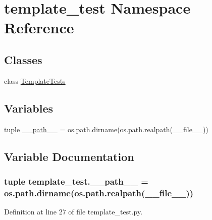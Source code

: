 \hypertarget{namespacetemplate__test}{\section{template\-\_\-test Namespace Reference}
\label{namespacetemplate__test}
}
\subsection*{Classes}
\begin{DoxyCompactItemize}
\item 
class \hyperlink{classtemplate__test_1_1TemplateTests}{Template\-Tests}
\end{DoxyCompactItemize}
\subsection*{Variables}
\begin{DoxyCompactItemize}
\item 
tuple \hyperlink{namespacetemplate__test_adc937cea0e7783070c8057ac549507c9}{\-\_\-\-\_\-path\-\_\-\-\_\-} = os.\-path.\-dirname(os.\-path.\-realpath(\-\_\-\-\_\-file\-\_\-\-\_\-))
\end{DoxyCompactItemize}


\subsection{Variable Documentation}
\hypertarget{namespacetemplate__test_adc937cea0e7783070c8057ac549507c9}{
\subsubsection[{\-\_\-\-\_\-path\-\_\-\-\_\-}]{\setlength{\rightskip}{0pt plus 5cm}tuple template\-\_\-test.\-\_\-\-\_\-path\-\_\-\-\_\- = os.\-path.\-dirname(os.\-path.\-realpath(\-\_\-\-\_\-file\-\_\-\-\_\-))}}\label{namespacetemplate__test_adc937cea0e7783070c8057ac549507c9}


Definition at line 27 of file template\-\_\-test.\-py.

